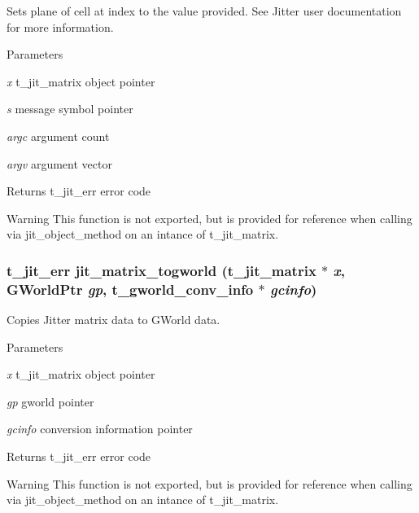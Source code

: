 Sets plane of cell at index to the value provided. See Jitter user documentation for more information.


\begin{DoxyParams}{Parameters}
\item[{\em x}]t\_\-jit\_\-matrix object pointer \item[{\em s}]message symbol pointer \item[{\em argc}]argument count \item[{\em argv}]argument vector\end{DoxyParams}
\begin{DoxyReturn}{Returns}
t\_\-jit\_\-err error code
\end{DoxyReturn}
\begin{DoxyWarning}{Warning}
This function is not exported, but is provided for reference when calling via jit\_\-object\_\-method on an intance of t\_\-jit\_\-matrix. 
\end{DoxyWarning}
\hypertarget{group__matrixmod_gac5ec23c849581a65c094654bbba41dee}{
\subsubsection[{jit\_\-matrix\_\-togworld}]{\setlength{\rightskip}{0pt plus 5cm}t\_\-jit\_\-err jit\_\-matrix\_\-togworld (t\_\-jit\_\-matrix $\ast$ {\em x}, \/  GWorldPtr {\em gp}, \/  t\_\-gworld\_\-conv\_\-info $\ast$ {\em gcinfo})}}
\label{group__matrixmod_gac5ec23c849581a65c094654bbba41dee}


Copies Jitter matrix data to GWorld data. 
\begin{DoxyParams}{Parameters}
\item[{\em x}]t\_\-jit\_\-matrix object pointer \item[{\em gp}]gworld pointer \item[{\em gcinfo}]conversion information pointer\end{DoxyParams}
\begin{DoxyReturn}{Returns}
t\_\-jit\_\-err error code
\end{DoxyReturn}
\begin{DoxyWarning}{Warning}
This function is not exported, but is provided for reference when calling via jit\_\-object\_\-method on an intance of t\_\-jit\_\-matrix. 
\end{DoxyWarning}
